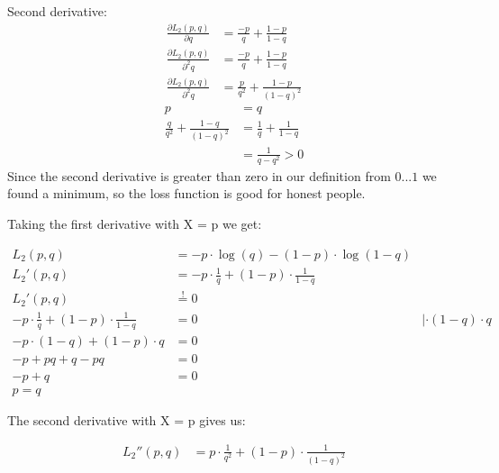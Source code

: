 Second derivative:
\begin{align*}
\frac{\partial L_2\left(p, q\right)}{\partial q} &= \frac{-p}{q} + \frac{1-p}{1-q} \\
\frac{\partial L_2\left(p, q\right)}{\partial^2 q} &= \frac{-p}{q} + \frac{1-p}{1-q} \\
\frac{\partial L_2\left(p, q\right)}{\partial^2 q} &= \frac{p}{q^2} + \frac{1-p}{\left(1-q\right)^2}
\end{align*}
\begin{align*}
p &= q\\
\frac{q}{q^2} + \frac{1-q}{\left(1-q\right)^2} &= \frac{1}{q} + \frac{1}{1-q} \\
&= \frac{1}{q-q^2} > 0
\end{align*}
Since the second derivative is greater than zero in our definition from $0...1$ we found a minimum, so the loss function is good for honest people.

Taking the first derivative with X = p we get:

\begin{align*}
  L_2 (p,q) &= -p \cdot \log{\left(q \right)} - (1-p) \cdot \log{\left(1-q \right)} \\
  L_2' (p,q) &= -p \cdot \frac{1}{q} + (1-p) \cdot \frac{1}{1-q} \\
  L_2' (p,q) &\stackrel{!}{=} 0 \\
   -p \cdot \frac{1}{q} + (1-p) \cdot \frac{1}{1-q} &= 0 &| \cdot (1-q) \cdot q \\
  -p \cdot (1-q) + (1-p) \cdot q & = 0 \\
  -p + pq + q - pq &= 0\\
  -p + q &= 0 \\
  p = q
\end{align*}

 The second derivative with X = p gives us:
 
 \begin{align*}
   L_2'' (p,q) &= p \cdot \frac{1}{q^2} + (1-p) \cdot \frac{1}{(1-q)^2}\\
\end{align*}

